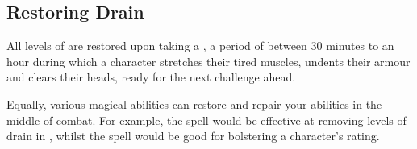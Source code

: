 \subsection{Restoring Drain}

All levels of  are restored upon taking a , a period of between 30 minutes to an hour during which a character stretches their tired muscles, undents their armour and clears their heads, ready for the next challenge ahead. 

Equally, various magical abilities can restore and repair your abilities in the middle of combat. For example, the  spell would be effective at removing levels of drain in , whilst the  spell would be good for bolstering a character's  rating.
